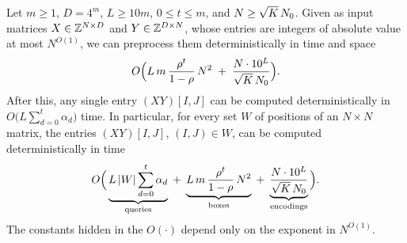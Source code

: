 \begin{theorem}\label{thm:singletech}
Let $m\ge1$, $D=4^m$, $L\ge10m$, $0\le t\le m$, and $N\ge\sqrt K\,N_0$. Given as input matrices $X\in\mathbb{Z}^{N\times D}$ and $Y\in\mathbb{Z}^{D\times N}$, whose entries are integers of absolute value at most $N^{O(1)}$, we can preprocess them deterministically in time and space
\begin{equation}\label{eq:prep}
O\Big(L\,m\,\frac{\rho^t}{1-\rho}\,N^2\;+\;\frac{N\cdot10^L}{\sqrt K\,N_0}\Big).
\end{equation}
After this, any single entry $(XY)[I,J]$ can be computed deterministically in $O\big(L\sum_{d=0}^{t}\alpha_d\big)$ time. In particular, for every set $W$ of positions of an $N\times N$ matrix, the entries $(XY)[I,J]$, $(I,J)\in W$, can be computed deterministically in time
\begin{equation}\label{eq:wanted}
O\Big(\underbrace{L\,|W|\sum_{d=0}^{t}\alpha_d}_{\text{\normalfont queries}}\;+\;\underbrace{L\,m\,\frac{\rho^t}{1-\rho}\,N^2}_{\text{\normalfont boxes}}\;+\;\underbrace{\frac{N\cdot10^L}{\sqrt K\,N_0}}_{\text{\normalfont encodings}}\Big).
\end{equation}
The constants hidden in the $O(\cdot)$ depend only on the exponent in $N^{O(1)}$.
\end{theorem}


